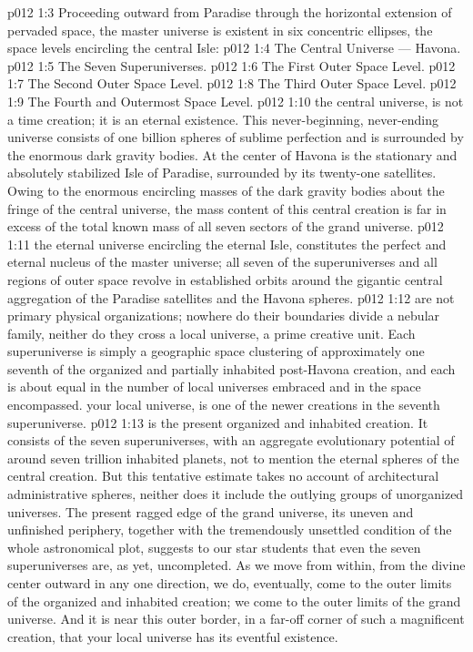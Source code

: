 \vs p012 1:3 \pc Proceeding outward from Paradise through the horizontal extension of pervaded space, the master universe is existent in six concentric ellipses, the space levels encircling the central Isle:
\vs p012 1:4 \bibnobreakspace The Central Universe --- Havona.
\vs p012 1:5 \bibnobreakspace The Seven Superuniverses.
\vs p012 1:6 \bibnobreakspace The First Outer Space Level.
\vs p012 1:7 \bibnobreakspace The Second Outer Space Level.
\vs p012 1:8 \bibnobreakspace The Third Outer Space Level.
\vs p012 1:9 \bibnobreakspace The Fourth and Outermost Space Level.
\vs p012 1:10 \pc {} the central universe, is not a time creation; it is an eternal existence. This never\hyp{}beginning, never\hyp{}ending universe consists of one billion spheres of sublime perfection and is surrounded by the enormous dark gravity bodies. At the center of Havona is the stationary and absolutely stabilized Isle of Paradise, surrounded by its twenty\hyp{}one satellites. Owing to the enormous encircling masses of the dark gravity bodies about the fringe of the central universe, the mass content of this central creation is far in excess of the total known mass of all seven sectors of the grand universe.
\vs p012 1:11 \pc {} the eternal universe encircling the eternal Isle, constitutes the perfect and eternal nucleus of the master universe; all seven of the superuniverses and all regions of outer space revolve in established orbits around the gigantic central aggregation of the Paradise satellites and the Havona spheres.
\vs p012 1:12  are not primary physical organizations; nowhere do their boundaries divide a nebular family, neither do they cross a local universe, a prime creative unit. Each superuniverse is simply a geographic space clustering of approximately one seventh of the organized and partially inhabited post\hyp{}Havona creation, and each is about equal in the number of local universes embraced and in the space encompassed.  your local universe, is one of the newer creations in  the seventh superuniverse.
\vs p012 1:13  is the present organized and inhabited creation. It consists of the seven superuniverses, with an aggregate evolutionary potential of around seven trillion inhabited planets, not to mention the eternal spheres of the central creation. But this tentative estimate takes no account of architectural administrative spheres, neither does it include the outlying groups of unorganized universes. The present ragged edge of the grand universe, its uneven and unfinished periphery, together with the tremendously unsettled condition of the whole astronomical plot, suggests to our star students that even the seven superuniverses are, as yet, uncompleted. As we move from within, from the divine center outward in any one direction, we do, eventually, come to the outer limits of the organized and inhabited creation; we come to the outer limits of the grand universe. And it is near this outer border, in a far\hyp{}off corner of such a magnificent creation, that your local universe has its eventful existence.

